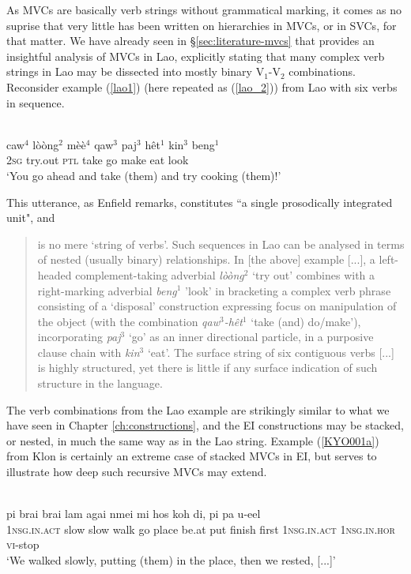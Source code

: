 As MVCs are basically verb strings without grammatical marking, it comes as no suprise that very little has been written on hierarchies in MVCs, or in SVCs, for that matter. We have already seen in §\ref{sec:literature-mvcs} that \citet{enfield2008verbs} provides an insightful analysis of MVCs in Lao, explicitly stating that many complex verb strings in Lao may be dissected into mostly binary V$_1$-V$_2$ combinations. Reconsider example (\ref{lao1}) (here repeated as (\ref{lao_2})) from Lao with six verbs in sequence.

\ea \label{lao_2}
\\
\gll caw$^4$ lòòng$^2$ mèè$^4$ qaw$^3$ paj$^3$ hêt$^1$ kin$^3$ beng$^1$ \\
2\textsc{sg} try.out \textsc{ptl} take go make eat look \\
\glft `You go ahead and take (them) and try cooking (them)!'\\ 
\z

This utterance, as Enfield remarks, constitutes ``a single prosodically integrated unit", and \begin{quote}is no mere `string of verbs'. Such sequences in Lao can be analysed in terms of nested (usually binary) relationships. In [the above] example [...], a left-headed complement-taking adverbial \textit{lòòng$^2$} `try out' combines with a right-marking adverbial \textit{beng$^1$} 'look' in bracketing a complex verb phrase consisting of a `disposal' construction expressing focus on manipulation of the object (with the combination \textit{qaw$^3$-hêt$^1$} `take (and) do/make'), incorporating \textit{paj$^3$} `go' as an inner directional particle, in a purposive clause chain with \textit{kin$^3$} `eat'. The surface string of six contiguous verbs [...] is highly structured, yet there is little if any surface indication of such structure in the language. \citep[83]{enfield2008verbs}\end{quote}

The verb combinations from the Lao example are strikingly similar to what we have seen in Chapter \ref{ch:constructions}, and the EI constructions may be stacked, or nested, in much the same way as in the Lao string. Example (\ref{KYO001a}) from Klon is certainly an extreme case of stacked MVCs in EI, but serves to illustrate how deep such recursive MVCs may extend. 

\ea \label{KYO001a}
\\
\gll pi brai brai lam agai nmei mi hos koh di, pi pa u-eel\\
\textsc{1}\textsc{nsg}.\textsc{in}.\textsc{act} slow slow walk go place be.at put finish first \textsc{1}\textsc{nsg}.\textsc{in}.\textsc{act} \textsc{1}\textsc{nsg}.\textsc{in}.\textsc{hor} \textsc{vi}-stop\\
\glft `We walked slowly, putting (them) in the place, then we rested, [...]'\\ 
\z

